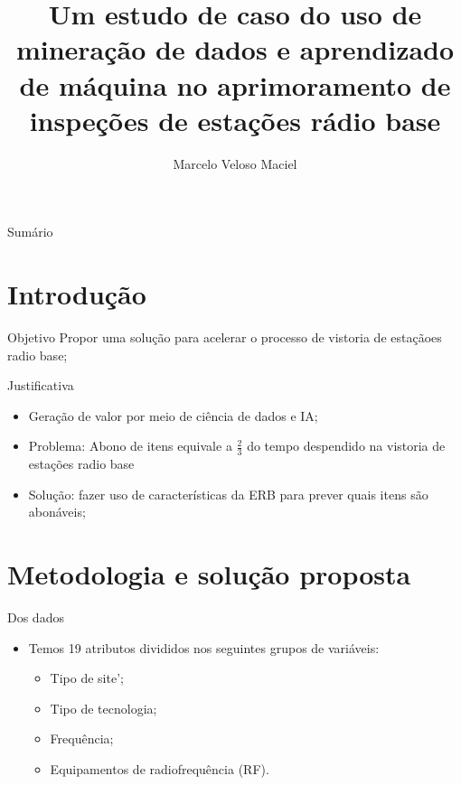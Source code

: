 \documentclass{beamer}
\title{Um estudo de caso do uso de mineração de dados e aprendizado de máquina
  no aprimoramento de inspeções de estações rádio base }
\date{}
\author{Marcelo Veloso Maciel}
\institute{}
\begin{document}
\maketitle



\begin{frame}{Sumário}
\tableofcontents
\end{frame}



\section{Introdução}
\begin{frame}{Objetivo}
  Propor uma solu\c{c}ão para acelerar o processo de vistoria de esta\c{c}ãoes
  radio base;
\end{frame}


\begin{frame}{Justificativa}
  \begin{itemize}
  \item Gera\c{c}ão de valor por meio de ciência de dados e IA;
  \item Problema: Abono de itens equivale a \( \frac{2}{3} \) do tempo
    despendido na vistoria de esta\c{c}ões radio base
    \item Solu\c{c}ão: fazer uso de características da ERB para prever quais
      itens são abonáveis;
  \end{itemize}
\end{frame}


\section{Metodologia e solu\c{c}ão proposta}


\begin{frame}{Dos dados}

\begin{itemize}
\item Temos 19 atributos divididos nos seguintes grupos de variáveis:
  \begin{itemize}
  \item Tipo de site’;
  \item Tipo de tecnologia;
  \item Frequência;
  \item Equipamentos de radiofrequência (RF).
  \end{itemize}
\end{itemize}
\end{frame}
\end{document}
